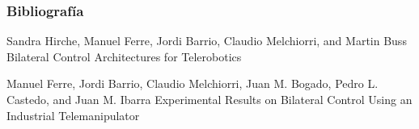 \documentclass{beamer}
\begin{document}
\begin{frame}[allowframebreaks]
  \frametitle<presentation>{Bibliografía}
    
  \begin{thebibliography}{10}
    
  \beamertemplatebookbibitems

 
    
  \beamertemplatearticlebibitems

  Sandra Hirche, Manuel Ferre, Jordi Barrio, Claudio Melchiorri, and Martin Buss
  \newblock Bilateral Control Architectures for Telerobotics
  
  Manuel Ferre, Jordi Barrio, Claudio Melchiorri, Juan M. Bogado, Pedro L. Castedo, and Juan M. Ibarra
  \newblock Experimental Results on Bilateral Control Using
  an Industrial Telemanipulator
  \end{thebibliography}
\end{frame}
\end{document}

